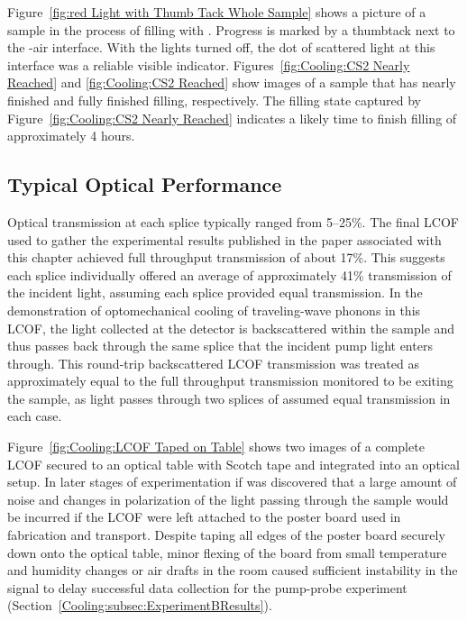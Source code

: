Figure~\ref{fig:red Light with Thumb Tack Whole Sample} shows a picture of a sample in the process of filling with . Progress is marked by a thumbtack next to the -air interface. With the lights turned off, the dot of scattered light at this interface was a reliable visible indicator. Figures~\ref{fig:Cooling:CS2 Nearly Reached} and \ref{fig:Cooling:CS2 Reached} show images of a sample that has nearly finished and fully finished filling, respectively. The filling state captured by Figure~\ref{fig:Cooling:CS2 Nearly Reached} indicates a likely time to finish filling of approximately 4 hours.

\subsection{Typical Optical Performance}
\label{Cooling:Appendix:subsec:Typical Optical Performance}

Optical transmission at each splice typically ranged from 5–25\%. The final \ac{LCOF} used to gather the experimental results published in the paper associated with this chapter achieved full throughput transmission of about 17\%. This suggests each splice individually offered an average of approximately 41\% transmission of the incident light, assuming each splice provided equal transmission. In the demonstration of optomechanical cooling of traveling-wave phonons in this \ac{LCOF}, the light collected at the detector is backscattered within the sample and thus passes back through the same splice that the incident pump light enters through. This round-trip backscattered \ac{LCOF} transmission was treated as approximately equal to the full throughput transmission monitored to be exiting the sample, as light passes through two splices of assumed equal transmission in each case.

Figure~\ref{fig:Cooling:LCOF Taped on Table} shows two images of a complete \ac{LCOF} secured to an optical table with Scotch tape and integrated into an optical setup. In later stages of experimentation if was discovered that a large amount of noise and changes in polarization of the light passing through the sample would be incurred if the \ac{LCOF} were left attached to the poster board used in fabrication and transport. Despite taping all edges of the poster board securely down onto the optical table, minor flexing of the board from small temperature and humidity changes or air drafts in the room caused sufficient instability in the signal to delay successful data collection for the pump-probe experiment (Section~\ref{Cooling:subsec:ExperimentBResults}).

